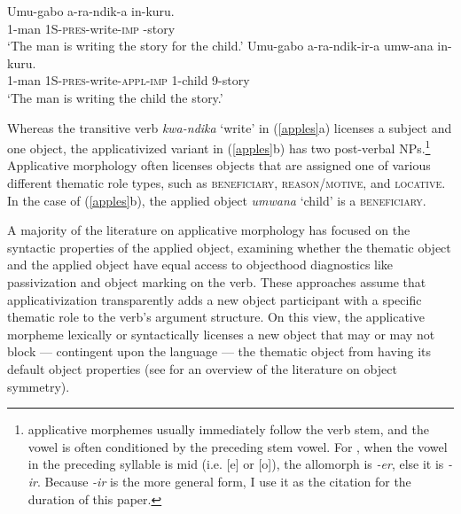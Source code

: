 \documentclass[output=paper]{langsci/langscibook}
\begin{document}
\begin{exe}
\ex\label{apples}
	\begin{xlist}
          \ex\gll Umu-gabo a-ra-ndik-a in-kuru.\\
          {\scshape 1}-man {\scshape 1S-pres}-write-{\scshape imp} {-}story\\
          \glt `The man is writing the story for the child.'
          \ex\gll Umu-gabo a-ra-ndik-ir-a umw-ana in-kuru.\\
          {\scshape 1}-man {\scshape 1S-pres}-write-{\scshape appl-imp} {\scshape 1-}child {\scshape 9-}story\\
          \glt `The man is writing the child the story.'
	\end{xlist}
\end{exe} 
%
Whereas the transitive verb \emph{kwa-ndika} `write' in (\ref{apples}a) licenses a subject and one object, the applicativized variant in (\ref{apples}b) has two post-verbal NPs.\footnote{ applicative morphemes usually immediately follow  the verb stem, and the vowel is often conditioned by the preceding stem vowel. For , when the vowel in the preceding syllable is mid (i.e. [e] or [o]), the allomorph is \emph{-er}, else it is \emph{-ir}. Because \emph{-ir} is the more general form, I use it as the citation for the duration of this paper.}  Applicative morphology often licenses objects that are assigned one of various different thematic role types, such as {\scshape beneficiary, reason/motive,} and {\scshape locative}. In the case of (\ref{apples}b), the applied object  \emph{umwana} `child' is a {\scshape beneficiary}.

 A majority of the literature on applicative morphology has focused on the syntactic properties of the applied object, examining whether the thematic object and the applied object have equal access to objecthood diagnostics like passivization and object marking on the verb. These approaches assume that applicativization transparently adds a new object participant with a specific thematic role to the verb's argument structure.  On this view, the applicative morpheme lexically or syntactically licenses a new object that may or may not block --- contingent upon the language ---  the thematic object from having its default object properties (see  for an overview of the literature on object symmetry).
\end{document}
